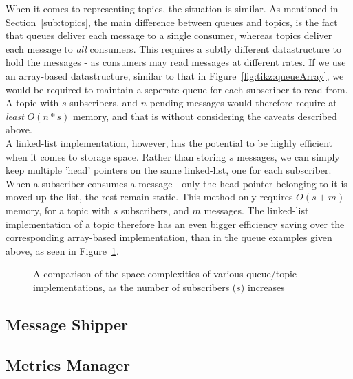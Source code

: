 When it comes to representing topics, the situation is similar. As mentioned in
Section~\ref{sub:topics}, the main difference between queues and topics, is the
fact that queues deliver each message to a single consumer, whereas topics
deliver each message to \emph{all} consumers. This requires a subtly different
datastructure to hold the messages - as consumers may read messages at different
rates. If we use an array-based datastructure, similar to that in
Figure~\ref{fig:tikz:queueArray}, we would be required to maintain a seperate
queue for each subscriber to read from. A topic with $s$
subscribers, and $n$ pending messages would therefore require at \emph{least}
$O(n * s)$ memory, and that is without considering the caveats described
above. \\

A linked-list implementation, however, has the potential to be highly efficient
when it comes to storage space. Rather than storing $s$ messages, we can simply
keep multiple 'head' pointers on the same linked-list, one for each subscriber.
When a subscriber consumes a message - only the head pointer belonging to it is
moved up the list, the rest remain static. This method only requires $O(s + m)$
memory, for a topic with $s$ subscribers, and $m$ messages. The linked-list
implementation of a topic therefore has an even bigger efficiency saving over
the corresponding array-based implementation, than in the queue examples given
above, as seen in Figure~\ref{fig:tikz:implementationSpaceComplexityGraph}.

\begin{figure}[H]
  \centering
  
  \caption{A comparison of the space complexities of various queue/topic
           implementations, as the number of subscribers ($s$) increases}
  \label{fig:tikz:implementationSpaceComplexityGraph}
\end{figure}

\subsection{Message Shipper}
\label{sub:Message Shipper}


\subsection{Metrics Manager}
\label{sub:Metrics Manager}

